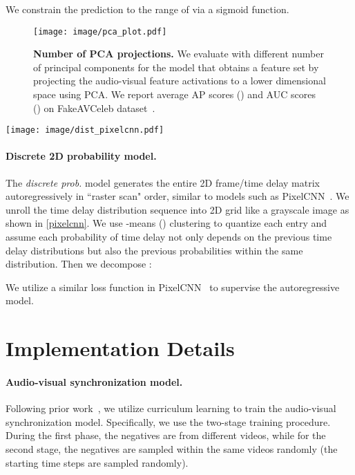 \documentclass[10pt,twocolumn,letterpaper]{article}
\newcommand{\mypar}[1]{\vspace{-3mm}\paragraph{#1}}
\def\upvspacefig{\vspace{-0.0mm}}
\begin{document}
We constrain the prediction  to the range of  via a sigmoid function.
\begin{figure}[t]
    \centering
    \upvspacefig
    \texttt{[image: image/pca\_plot.pdf]}
    \caption{\textbf{Number of PCA projections.} We evaluate with different number of principal components for the model that obtains a feature set by projecting the audio-visual feature activations to a lower dimensional space using PCA. We report average AP scores () and AUC scores () on FakeAVCeleb dataset~\cite{NEURIPS_DATASETS_AND_BENCHMARKS2021_d9d4f495}.} 
    \label{number_pca}
\end{figure} \begin{figure*}[t!]
    \centering
    \upvspacefig
 \texttt{[image: image/dist\_pixelcnn.pdf]}
    \caption{\textbf{Visualization of discrete probability grid.} We use K-means clustering to quantize the probability space to convert continuous synchronization probability  to discrete probability bin . Then we build a autoregressive Transformer~\cite{vaswani2017attention} model on the probability grid. }
    \label{pixelcnn}
\end{figure*}
 \mypar{Discrete 2D probability model.} 
The {\em discrete prob.} model generates the entire 2D frame/time delay matrix autoregressively in ``raster scan" order, similar to models such as PixelCNN~\cite{van2016pixel,salimans2017pixelcnn++}. We unroll the time delay distribution sequence into 2D grid like a grayscale image as shown in \cref{pixelcnn}. We use -means () clustering to quantize each entry and assume each probability  of time delay not only depends on the previous time delay distributions but also the previous probabilities within the same distribution. Then we decompose :

We utilize a similar loss function in PixelCNN~\cite{salimans2017pixelcnn++,van2016pixel} to supervise the autoregressive model.



\section{Implementation Details}
\label{appendix:imple}
\paragraph{Audio-visual synchronization model.}
Following prior work~\cite{Afouras20b,chen2021audio,korbar2018cooperative}, we utilize curriculum learning to train the audio-visual synchronization model. Specifically, we use the two-stage training procedure. During the first phase, the negatives are from different videos, while for the second stage, the negatives are sampled within the same videos randomly (the starting time steps are sampled randomly). 
\end{document}

